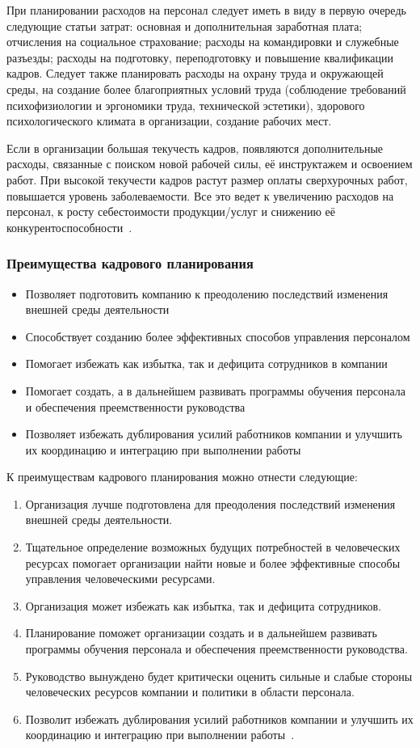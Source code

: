 \documentclass{../industrial-development}
\begin{document}
При планировании расходов на персонал следует иметь в виду в первую очередь следующие статьи затрат: основная и дополнительная заработная плата; отчисления на социальное страхование; расходы на командировки и служебные разъезды; расходы на подготовку, переподготовку и повышение квалификации кадров. Следует также планировать расходы на охрану труда и окружающей среды, на создание более благоприятных условий труда (соблюдение требований психофизиологии и эргономики труда, технической эстетики), здорового психологического климата в организации, создание рабочих мест.

Если в организации большая текучесть кадров, появляются дополнительные расходы, связанные с поиском новой рабочей силы, её инструктажем и освоением работ. При высокой текучести кадров растут размер оплаты сверхурочных работ, повышается уровень заболеваемости. Все это ведет к увеличению расходов на персонал, к росту себестоимости продукции/услуг и снижению её конкурентоспособности~\cite{Durakova}.

\begin{frame} \frametitle{Преимущества кадрового планирования}
	\begin{itemize}
		\item Позволяет подготовить компанию к преодолению последствий изменения внешней среды деятельности
		\item	Способствует созданию более эффективных способов управления персоналом
		\item	Помогает избежать как избытка, так и дефицита сотрудников в компании
		\item	Помогает создать, а в дальнейшем развивать программы обучения персонала и обеспечения преемственности руководства
		\item	Позволяет избежать дублирования усилий работников компании и улучшить их координацию и интеграцию при выполнении работы 
	\end{itemize}
\end{frame}

\lecturenotes

К преимуществам кадрового планирования можно отнести следующие:
\begin{enumerate}
	\item	Организация лучше подготовлена для преодоления последствий изменения внешней среды деятельности.
	\item	Тщательное определение возможных будущих потребностей в человеческих ресурсах помогает организации найти новые и более эффективные способы управления человеческими ресурсами.
	\item	Организация может избежать как избытка, так и дефицита сотрудников.
	\item	Планирование поможет организации создать и в дальнейшем развивать программы обучения персонала и обеспечения преемственности руководства.
	\item	Руководство вынуждено будет критически оценить сильные и слабые стороны человеческих ресурсов компании и политики в области персонала.
	\item	Позволит избежать дублирования усилий работников компании и улучшить их координацию и интеграцию при выполнении работы~\cite[с.~89]{Ivanova}.
\end{enumerate}
\end{document}
